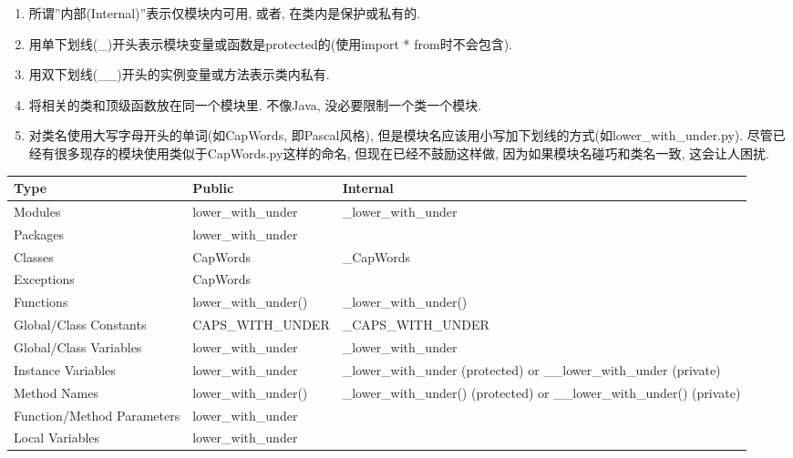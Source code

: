 \documentclass[a4paper,10pt,english]{sphinxmanual}
\begin{document}
\begin{enumerate}
\item {} 
所谓”内部(Internal)”表示仅模块内可用, 或者, 在类内是保护或私有的.

\item {} 
用单下划线(\_)开头表示模块变量或函数是protected的(使用import * from时不会包含).

\item {} 
用双下划线(\_\_)开头的实例变量或方法表示类内私有.

\item {} 
将相关的类和顶级函数放在同一个模块里. 不像Java, 没必要限制一个类一个模块.

\item {} 
对类名使用大写字母开头的单词(如CapWords, 即Pascal风格), 但是模块名应该用小写加下划线的方式(如lower\_with\_under.py). 尽管已经有很多现存的模块使用类似于CapWords.py这样的命名, 但现在已经不鼓励这样做, 因为如果模块名碰巧和类名一致, 这会让人困扰.

\end{enumerate}



\begin{savenotes}\sphinxattablestart
\centering
\begin{tabulary}{\linewidth}[t]{|T|T|T|}
\hline
\sphinxstyletheadfamily 
Type
&\sphinxstyletheadfamily 
Public
&\sphinxstyletheadfamily 
Internal
\\
\hline
Modules
&
lower\_with\_under
&
\_lower\_with\_under
\\
\hline
Packages
&
lower\_with\_under
&\\
\hline
Classes
&
CapWords
&
\_CapWords
\\
\hline
Exceptions
&
CapWords
&\\
\hline
Functions
&
lower\_with\_under()
&
\_lower\_with\_under()
\\
\hline
Global/Class Constants
&
CAPS\_WITH\_UNDER
&
\_CAPS\_WITH\_UNDER
\\
\hline
Global/Class Variables
&
lower\_with\_under
&
\_lower\_with\_under
\\
\hline
Instance Variables
&
lower\_with\_under
&
\_lower\_with\_under (protected) or \_\_lower\_with\_under (private)
\\
\hline
Method Names
&
lower\_with\_under()
&
\_lower\_with\_under() (protected) or \_\_lower\_with\_under() (private)
\\
\hline
Function/Method Parameters
&
lower\_with\_under
&\\
\hline
Local Variables
&
lower\_with\_under
&\\
\hline
\end{tabulary}
\par
\sphinxattableend\end{savenotes}
\end{document}
